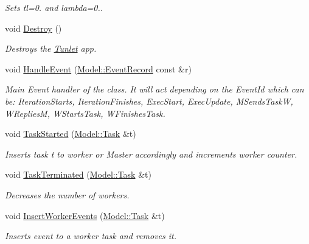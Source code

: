 \begin{DoxyCompactItemize}
\begin{DoxyCompactList}\small\item\em Sets tl=0. and lambda=0.. \end{DoxyCompactList}\item 
\hypertarget{class_adjusting_n_w_tunlet_a32d234877e91d1cb81e3470e126e9588}{void \hyperlink{class_adjusting_n_w_tunlet_a32d234877e91d1cb81e3470e126e9588}{Destroy} ()}\label{class_adjusting_n_w_tunlet_a32d234877e91d1cb81e3470e126e9588}

\begin{DoxyCompactList}\small\item\em Destroys the \hyperlink{class_tunlet}{Tunlet} app. \end{DoxyCompactList}\item 
void \hyperlink{class_adjusting_n_w_tunlet_ab370126f43c0f535045a9cc934806661}{Handle\-Event} (\hyperlink{class_model_1_1_event_record}{Model\-::\-Event\-Record} const \&r)
\begin{DoxyCompactList}\small\item\em Main Event handler of the class. It will act depending on the Event\-Id which can be\-: Iteration\-Starts, Iteration\-Finishes, Exec\-Start, Exec\-Update, M\-Sends\-Task\-W, W\-Replies\-M, W\-Starts\-Task, W\-Finishes\-Task. \end{DoxyCompactList}\item 
void \hyperlink{class_adjusting_n_w_tunlet_a03d88d318e66827d0211aad6dbaec250}{Task\-Started} (\hyperlink{class_model_1_1_task}{Model\-::\-Task} \&t)
\begin{DoxyCompactList}\small\item\em Inserts task t to worker or Master accordingly and increments worker counter. \end{DoxyCompactList}\item 
void \hyperlink{class_adjusting_n_w_tunlet_a9c0a9d17ac7e8afd43caf83c733f65ca}{Task\-Terminated} (\hyperlink{class_model_1_1_task}{Model\-::\-Task} \&t)
\begin{DoxyCompactList}\small\item\em Decreases the number of workers. \end{DoxyCompactList}\item 
void \hyperlink{class_adjusting_n_w_tunlet_aaeb5051f1a20e865fea2722546730a00}{Insert\-Worker\-Events} (\hyperlink{class_model_1_1_task}{Model\-::\-Task} \&t)
\begin{DoxyCompactList}\small\item\em Inserts event to a worker task and removes it. \end{DoxyCompactList}\item 

\end{DoxyCompactItemize}

